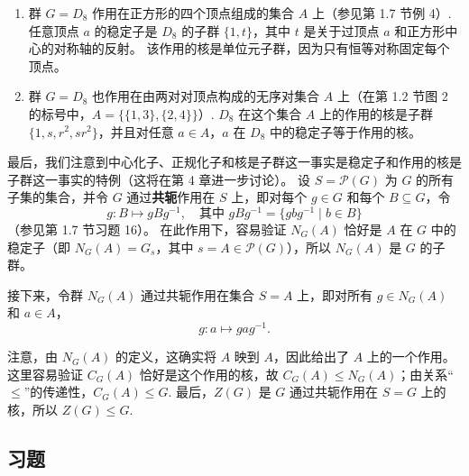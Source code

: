 \begin{example}
\begin{enumerate}[label=(\arabic*)]
\item 群 \( G = D_8 \) 作用在正方形的四个顶点组成的集合 \( A \) 上（参见第 1.7 节例 4）.
任意顶点 \( a \) 的稳定子是 \( D_8 \) 的子群 \( \{1, t\} \)，其中 \( t \) 是关于过顶点 \( a \) 和正方形中心的对称轴的反射。
该作用的核是单位元子群，因为只有恒等对称固定每个顶点。

\item 群 \( G = D_8 \) 也作用在由两对对顶点构成的无序对集合 \( A \) 上（在第 1.2 节图 2 的标号中，\( A = \{ \{1, 3\}, \{2, 4\} \} \)）. 
\( D_8 \) 在这个集合 \( A \) 上的作用的核是子群 \( \{1, s, r^2, sr^2\} \)，并且对任意 \( a \in A \)，\( a \) 在 \( D_8 \) 中的稳定子等于作用的核。
\end{enumerate}
\end{example}

最后，我们注意到中心化子、正规化子和核是子群这一事实是稳定子和作用的核是子群这一事实的特例（这将在第 4 章进一步讨论）。
设 \( S = \mathcal{P}(G) \) 为 \( G \) 的所有子集的集合，并令 \( G \) 通过\textbf{共轭}作用在 \( S \) 上，即对每个 \( g \in G \) 和每个 \( B \subseteq G \)，令
\[
g : B \mapsto gBg^{-1}, \quad \text{其中 } gBg^{-1} = \{ gbg^{-1} \mid b \in B \}
\]
（参见第 1.7 节习题 16）。
在此作用下，容易验证 \( N_G(A) \) 恰好是 \( A \) 在 \( G \) 中的稳定子（即 \( N_G(A) = G_s \)，其中 \( s = A \in \mathcal{P}(G) \)），所以 \( N_G(A) \) 是 \( G \) 的子群。

接下来，令群 \( N_G(A) \) 通过共轭作用在集合 \( S = A \) 上，即对所有 \( g \in N_G(A) \) 和 \( a \in A \)，
\[
g : a \mapsto gag^{-1}.
\]

注意，由 \( N_G(A) \) 的定义，这确实将 \( A \) 映到 \( A \)，因此给出了 \( A \) 上的一个作用。
这里容易验证 \( C_G(A) \) 恰好是这个作用的核，故 \( C_G(A) \leq N_G(A) \)；由关系“\(\leq\)”的传递性，\( C_G(A) \leq G \). 
最后，\( Z(G) \) 是 \( G \) 通过共轭作用在 \( S = G \) 上的核，所以 \( Z(G) \leq G \).

\subsection*{习题}

